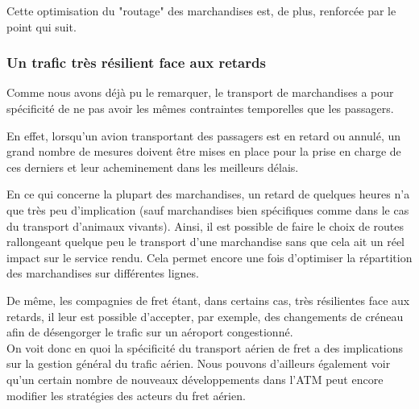 Cette optimisation du "routage" des marchandises est, de plus, renforcée par le point qui suit.

\subsubsection{Un trafic très résilient face aux retards}

Comme nous avons déjà pu le remarquer, le transport de marchandises a pour spécificité de ne pas avoir les mêmes contraintes temporelles que les passagers.

En effet, lorsqu'un avion transportant des passagers est en retard ou annulé, un grand nombre de mesures doivent être mises en place pour la prise en charge de ces derniers et leur acheminement dans les meilleurs délais.

En ce qui concerne la plupart des marchandises, un retard de quelques heures n'a que très peu d'implication (sauf marchandises bien spécifiques comme dans le cas du transport d'animaux vivants). Ainsi, il est possible de faire le choix de routes rallongeant quelque peu le transport d'une marchandise sans que cela ait un réel impact sur le service rendu. Cela permet encore une fois d'optimiser la répartition des marchandises sur différentes lignes.

De même, les compagnies de fret étant, dans certains cas, très résilientes face aux retards, il leur est possible d'accepter, par exemple, des changements de créneau afin de désengorger le trafic sur un aéroport congestionné.\\

On voit donc en quoi la spécificité du transport aérien de fret a des implications sur la gestion général du trafic aérien. Nous pouvons d'ailleurs également voir qu'un certain nombre de nouveaux développements dans l'ATM peut encore modifier les stratégies des acteurs du fret aérien.